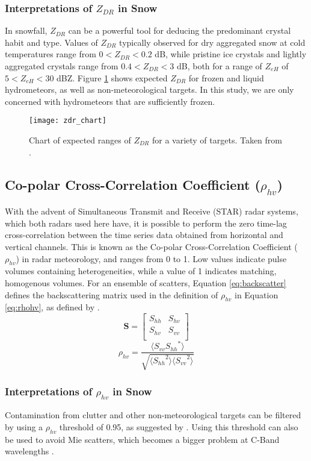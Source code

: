 \subsubsection{Interpretations of $Z_{DR}$ in Snow}
In snowfall, $Z_{DR}$ can be a powerful tool for deducing the predominant crystal habit and type. Values of $Z_{DR}$ typically observed for dry aggregated snow at cold temperatures range from $0 < Z_{DR} < 0.2$ dB, while pristine ice crystals and lightly aggregated crystals range from $0.4 < Z_{DR} < 3$ dB, both for a range of $Z_{eH}$ of $5 < Z_{eH} < 30$ dBZ. Figure \ref{zdr_chart} shows expected $Z_{DR}$ for frozen and liquid hydrometeors, as well as non-meteorological targets. In this study, we are only concerned with hydrometeors that are sufficiently frozen.
\begin{figure}[H]
\texttt{[image: zdr\_chart]}
\caption{Chart of expected ranges of $Z_{DR}$ for a variety of targets. Taken from \citet{Fabry2015}.} 
\label{zdr_chart}
\end{figure}
\subsection{Co-polar Cross-Correlation Coefficient ($\rho_{hv}$)}
With the advent of Simultaneous Transmit and Receive (STAR) radar systems, which both radars used here have, it is possible to perform the zero time-lag
cross-correlation between the time series data obtained from horizontal and vertical channels. This is known as the Co-polar Cross-Correlation Coefficient
($\rho_{hv}$) in radar meteorology, and ranges from 0 to 1. Low values indicate pulse volumes containing heterogeneities, while a value of 1 indicates
matching, homogenous volumes. For an ensemble of scatters, Equation \ref{eq:backscatter} defines the backscattering matrix used in the definition of
$\rho_{hv}$ in Equation \ref{eq:rhohv}, as defined by \citet{Ryzhkov2007b}.
\begin{equation}\label{eq:backscatter}
\mathbf{S} = \begin{bmatrix}
             S_{hh}       & S_{hv} \\
             S_{hv}       & S_{vv} \\
             \end{bmatrix}
\end{equation}
\begin{equation}\label{eq:rhohv}
\rho_{hv} = \frac{\langle{S_{vv}{S_{hh}}^{*}\rangle}}{\sqrt{\langle{{S_{hh}}^{2}\rangle}\langle{{S_{vv}}^{2}\rangle}}}
\end{equation}
\subsubsection{Interpretations of $\rho_{hv}$ in Snow}
Contamination from clutter and other non-meteorological targets can be filtered by using a $\rho_{hv}$ threshold of 0.95, as suggested by \citet{Straka2000}.
Using this threshold can also be used to avoid Mie scatters, which becomes a bigger problem at C-Band wavelengths \citet{Fabry2015}.
 



